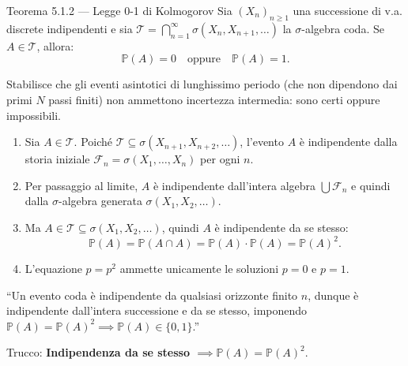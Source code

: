 \documentclass[11pt,a4paper]{report}
\begin{document}
\begin{teoremabox}{Teorema 5.1.2 --- Legge 0-1 di Kolmogorov}
Sia $(X_n)_{n \ge 1}$ una successione di v.a. discrete indipendenti e sia $\mathcal{T} = \bigcap_{n=1}^\infty \sigma(X_n, X_{n+1}, \dots)$ la $\sigma$-algebra coda. Se $A \in \mathcal{T}$, allora:
\[
\mathbb{P}(A) = 0 \quad \text{oppure} \quad \mathbb{P}(A) = 1.
\]

\begin{cosafa}
Stabilisce che gli eventi asintotici di lunghissimo periodo (che non dipendono dai primi $N$ passi finiti) non ammettono incertezza intermedia: sono certi oppure impossibili.
\end{cosafa}

\begin{dimostrazione}
\begin{enumerate}
    \item Sia $A \in \mathcal{T}$. Poiché $\mathcal{T} \subseteq \sigma(X_{n+1}, X_{n+2}, \dots)$, l'evento $A$ è indipendente dalla storia iniziale $\mathcal{F}_n = \sigma(X_1, \dots, X_n)$ per ogni $n$.
    \item Per passaggio al limite, $A$ è indipendente dall'intera algebra $\bigcup \mathcal{F}_n$ e quindi dalla $\sigma$-algebra generata $\sigma(X_1, X_2, \dots)$.
    \item Ma $A \in \mathcal{T} \subseteq \sigma(X_1, X_2, \dots)$, quindi $A$ è indipendente da se stesso:
    \[
    \mathbb{P}(A) = \mathbb{P}(A \cap A) = \mathbb{P}(A) \cdot \mathbb{P}(A) = \mathbb{P}(A)^2.
    \]
    \item L'equazione $p = p^2$ ammette unicamente le soluzioni $p=0$ e $p=1$.
\end{enumerate}
\end{dimostrazione}

\begin{oralbox}
``Un evento coda è indipendente da qualsiasi orizzonte finito $n$, dunque è indipendente dall'intera successione e da se stesso, imponendo $\mathbb{P}(A) = \mathbb{P}(A)^2 \implies \mathbb{P}(A) \in \{0,1\}$.''
\end{oralbox}

\begin{tipbox}
Trucco: \textbf{Indipendenza da se stesso $\implies \mathbb{P}(A) = \mathbb{P}(A)^2$}.
\end{tipbox}
\end{teoremabox}

\vspace{0.3cm}
\end{document}

